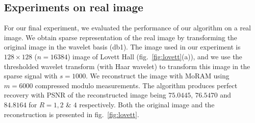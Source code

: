 \subsection{Experiments on real image}
For our final experiment, we evaluated the performance of our algorithm on a real image. We obtain sparse representation of the real image by transforming the original image in the wavelet basis (db1). The image used in our experiment is $128 \times 128$ ($n=16384$) image of Lovett Hall (fig.~\ref{fig:lovett}(a)), and  we use the thresholded wavelet transform (with Haar wavelet) to transform this image in the sparse signal with $s = 1000$. We reconstruct the image with MoRAM using $m = 6000$ compressed modulo measurements. The algorithm produces perfect recovery with PSNR of the reconstructed image being $75.0445$, $ 76.5470$ and $84.8164$ for $R=1,2$ \& $4$ respectively. Both the original image and the reconstruction is presented in fig.~\ref{fig:lovett}.
%
